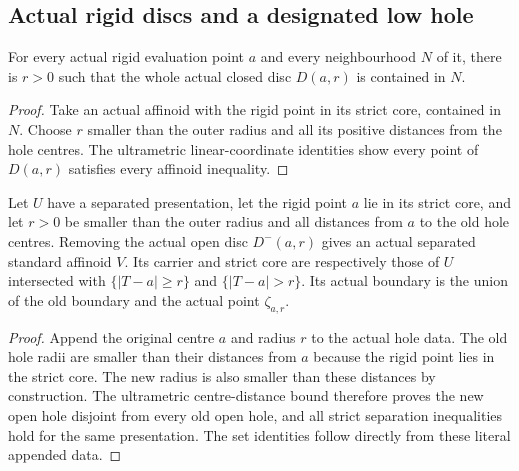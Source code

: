 \subsection{Actual rigid discs and a designated low hole}\label{subsec:fc-line-affinoid-punctures}

\begin{lemma}\label{lem:fc-rigid-closed-disc-basis}
\leanok
{}
For every actual rigid evaluation point $a$ and every neighbourhood $N$
of it, there is $r>0$ such that the whole actual closed disc $D(a,r)$
is contained in $N$.
\end{lemma}

\begin{proof}
Take an actual affinoid with the rigid point in its strict core, contained
in $N$. Choose $r$ smaller than the outer radius and all its positive
distances from the hole centres. The ultrametric linear-coordinate
identities show every point of $D(a,r)$ satisfies every affinoid inequality.
\end{proof}

\begin{lemma}\label{lem:fc-separated-affinoid-puncture}
\leanok
{}
Let $U$ have a separated presentation, let the rigid point $a$ lie in its
strict core, and let $r>0$ be smaller than the outer radius and all distances
from $a$ to the old hole centres. Removing the actual open disc $D^-(a,r)$
gives an actual separated standard affinoid $V$. Its carrier and strict core
are respectively those of $U$ intersected with $\{|T-a|\ge r\}$ and
$\{|T-a|>r\}$. Its actual boundary is the union of the old boundary and
the actual point $\zeta_{a,r}$.
\end{lemma}

\begin{proof}
Append the original centre $a$ and radius $r$ to the actual hole data.
The old hole radii are smaller than their distances from $a$ because the
rigid point lies in the strict core. The new radius is also smaller than
these distances by construction. The ultrametric centre-distance bound
therefore proves the new open hole disjoint from every old open hole,
and all strict separation inequalities hold for the same presentation.
The set identities follow directly from these literal appended data.
\end{proof}
